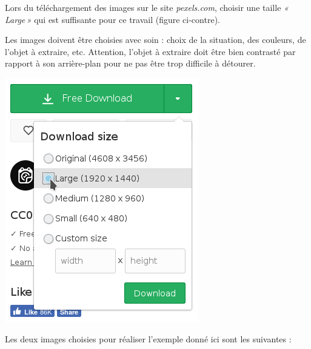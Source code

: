 \begin{minipage}[c]{.67\linewidth}
Lors du téléchargement des images sur le site \emph{pexels.com}, choisir une taille \emph{«\,Large\,»} qui est suffisante pour ce travail (figure ci-contre).

\vspace{6pt}

Les images doivent être choisies avec soin : choix de la situation, des couleurs, de l'objet à extraire, etc. Attention, l'objet à extraire doit être bien contrasté par rapport à son arrière-plan pour ne pas être trop difficile à détourer.

\end{minipage}\hfill
\begin{minipage}[c]{.27\linewidth}
\centering%
\includegraphics[angle=0,width=\textwidth]{./images/image03/pexelsDL}
\end{minipage}


Les deux images choisies pour réaliser l'exemple donné ici sont les suivantes :
 







